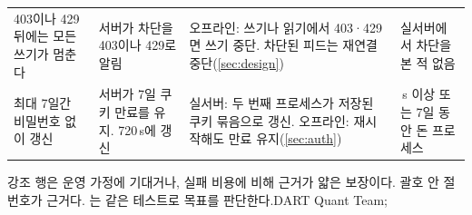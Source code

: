 {{\begin{tabularx}{\linewidth}{>{\RaggedRight\arraybackslash}p{38mm} >{\RaggedRight\arraybackslash}p{42mm} >{\RaggedRight\arraybackslash}X >{\RaggedRight\arraybackslash}p{44mm}}
403이나 429 뒤에는 모든 쓰기가 멈춘다 & 서버가 차단을 403이나 429로 알림 & 오프라인: 쓰기나 읽기에서 403·429면 쓰기 중단. 차단된 피드는 재연결 중단(\ref{sec:design}) & 실서버에서 차단을 본 적 없음\\\rowsep
최대 7일간 비밀번호 없이 갱신 & 서버가 7일 쿠키 만료를 유지. 720\,s에 갱신 & 실서버: 두 번째 프로세스가 저장된 쿠키 묶음으로 갱신. 오프라인: 재시작해도 만료 유지(\ref{sec:auth}) & 720\,s 이상 또는 7일 동안 돈 프로세스\\
\end{tabularx}}}{강조 행은 운영 가정에 기대거나, 실패 비용에 비해 근거가 얇은 보장이다. 괄호 안 절 번호가 근거다. 는 같은 테스트로 목표를 판단한다.}{DART Quant Team; }
